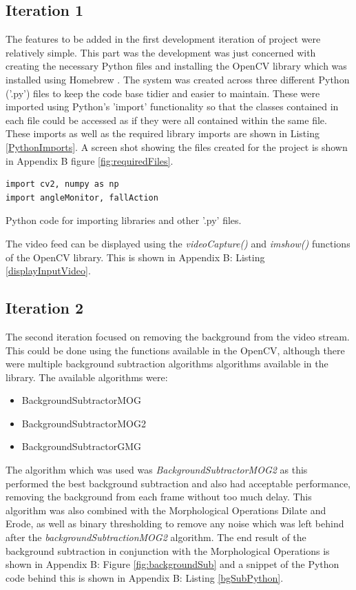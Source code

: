 \documentclass[11pt,a4paper]{report}
\begin{document}
\subsection{Iteration 1}

The features to be added in the first development iteration of project were relatively simple. This part was the development was just concerned with creating the necessary Python files and installing the OpenCV library which was installed using Homebrew \citep{Homebrew}. The system was created across three different Python ('.py') files to keep the code base tidier and easier to maintain. These were imported using Python's 'import' functionality so that the classes contained in each file could be accessed as if they were all contained within the same file. These imports as well as the required library imports are shown in Listing \ref{PythonImports}. A screen shot showing the files created for the project is shown in Appendix B figure \ref{fig:requiredFiles}. 

\begin{listing}
\begin{verbatim}
import cv2, numpy as np
import angleMonitor, fallAction
\end{verbatim}
\caption{Python code for importing libraries and other '.py' files.}
\label{PythonImports}
\end{listing}
\noindent
The video feed can be displayed using the \textit{videoCapture()} and \textit{imshow()} functions of the OpenCV library. This is shown in Appendix B: Listing \ref{displayInputVideo}.

\subsection{Iteration 2}

The second iteration focused on removing the background from the video stream. This could be done using the functions available in the OpenCV, although there were multiple background subtraction algorithms algorithms available in the library. The available algorithms were:

\begin{itemize}
  \item BackgroundSubtractorMOG
  \item BackgroundSubtractorMOG2
  \item BackgroundSubtractorGMG
\end{itemize}
\noindent
The algorithm which was used was \textit{BackgroundSubtractorMOG2} as this performed the best background subtraction and also had acceptable performance, removing the background from each frame without too much delay. This algorithm was also combined with the Morphological Operations Dilate and Erode, as well as binary thresholding to remove any noise which was left behind after the \textit{backgroundSubtractionMOG2} algorithm. The end result of the background subtraction in conjunction with the Morphological Operations is shown in Appendix B: Figure \ref{fig:backgroundSub} and a snippet of the Python code behind this is shown in Appendix B: Listing \ref{bgSubPython}.
\end{document}
